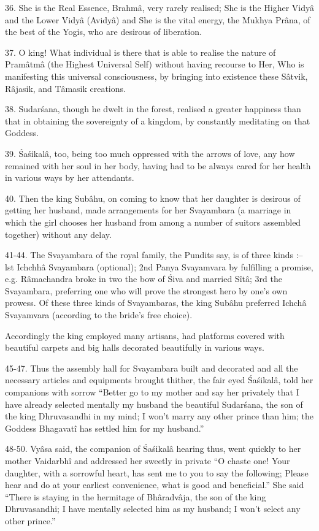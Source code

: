 36. She is the Real Essence, Brahm\^a, very rarely realised; She is the Higher Vidy\^a and the Lower Vidy\^a (Avidy\^a) and She is the vital energy, the Mukhya Pr\^ana, of the best of the Yogis, who are desirous of liberation.

37. O king! What individual is there that is able to realise the nature of Pram\^atm\^a (the Highest Universal Self) without having recourse to Her, Who is manifesting this universal consciousness, by bringing into existence these S\^atvik, R\^ajasik, and T\^amasik creations.

38. Sudar\'sana, though he dwelt in the forest, realised a greater happiness than that in obtaining the sovereignty of a kingdom, by constantly meditating on that Goddess.

39. \'Sa\'sikal\^a, too, being too much oppressed with the arrows of love, any how remained with her soul in her body, having had to be always cared for her health in various ways by her attendants.

40. Then the king Sub\^ahu, on coming to know that her daughter is desirous of getting her husband, made arrangements for her Svayambara (a marriage in which the girl chooses her husband from among a number of suitors assembled together) without any delay.

41-44. The Svayambara of the royal family, the Pundits say, is of three kinds :-- lst Ichchh\^a Svayambara (optional); 2nd Panya Svayamvara by fulfilling a promise, e.g. R\^amachandra broke in two the bow of \'Siva and married S\^it\^a; 3rd the Svayambara, preferring one who will prove the strongest hero by one's own prowess. Of these three kinds of Svayambaras, the king Sub\^ahu preferred Ichch\^a Svayamvara (according to the bride's free choice).

Accordingly the king employed many artisans, had platforms covered with beautiful carpets and big halls decorated beautifully in various ways.

45-47. Thus the assembly hall for Svayambara built and decorated and all the necessary articles and equipments brought thither, the fair eyed \'Sa\'sikal\^a, told her companions with sorrow ``Better go to my mother and say her privately that I have already selected mentally my husband the beautiful Sudar\'sana, the son of the king Dhruvasandhi in my mind; I won't marry any other prince than him; the Goddess Bhagavat\^i has settled him for my husband.''

48-50. Vy\^asa said, the companion of \'Sa\'sikal\^a hearing thus, went quickly to her mother Vaidarbh\^i and addressed her sweetly in private ``O chaste one! Your daughter, with a sorrowful heart, has sent me to you to say the following; Please hear and do at your earliest convenience, what is good and beneficial.'' She said ``There is staying in the hermitage of Bh\^aradv\^aja, the son of the king Dhruvasandhi; I have mentally selected him as my husband; I won't select any other prince.''

